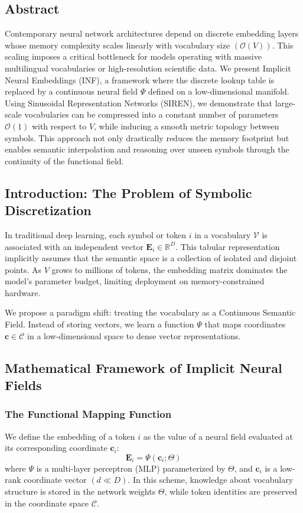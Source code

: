 \documentclass{article}
\numberwithin{equation}{section}
\begin{document}
\subsection*{Abstract}
Contemporary neural network architectures depend on discrete embedding layers whose memory complexity scales linearly with vocabulary size $(\mathcal{O}(V))$. This scaling imposes a critical bottleneck for models operating with massive multilingual vocabularies or high-resolution scientific data. We present Implicit Neural Embeddings (INF), a framework where the discrete lookup table is replaced by a continuous neural field $\Psi$ defined on a low-dimensional manifold. Using Sinusoidal Representation Networks (SIREN), we demonstrate that large-scale vocabularies can be compressed into a constant number of parameters $\mathcal{O}(1)$ with respect to $V$, while inducing a smooth metric topology between symbols. This approach not only drastically reduces the memory footprint but enables semantic interpolation and reasoning over unseen symbols through the continuity of the functional field.

\subsection{Introduction: The Problem of Symbolic Discretization}
In traditional deep learning, each symbol or token $i$ in a vocabulary $\mathcal{V}$ is associated with an independent vector $\mathbf{E}_i \in \mathbb{R}^D$. This tabular representation implicitly assumes that the semantic space is a collection of isolated and disjoint points. As $V$ grows to millions of tokens, the embedding matrix dominates the model's parameter budget, limiting deployment on memory-constrained hardware.

We propose a paradigm shift: treating the vocabulary as a Continuous Semantic Field. Instead of storing vectors, we learn a function $\Psi$ that maps coordinates $\mathbf{c} \in \mathcal{C}$ in a low-dimensional space to dense vector representations.

\subsection{Mathematical Framework of Implicit Neural Fields}
\subsubsection{The Functional Mapping Function}
We define the embedding of a token $i$ as the value of a neural field evaluated at its corresponding coordinate $\mathbf{c}_i$:
\[
\mathbf{E}_i = \Psi(\mathbf{c}_i; \Theta)
\]
where $\Psi$ is a multi-layer perceptron (MLP) parameterized by $\Theta$, and $\mathbf{c}_i$ is a low-rank coordinate vector $(d \ll D)$. In this scheme, knowledge about vocabulary structure is stored in the network weights $\Theta$, while token identities are preserved in the coordinate space $\mathcal{C}$.
\end{document}
